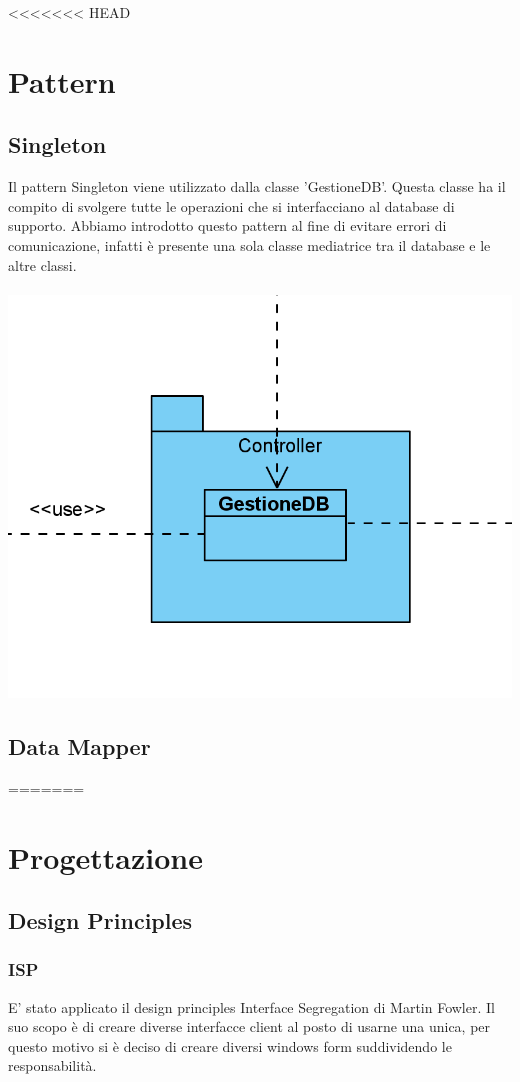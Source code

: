 \documentclass[a4paper, titlepage]{article}
\begin{document}
<<<<<<< HEAD
\section{Pattern}
\vphantom{}
\subsection{Singleton}
Il pattern Singleton viene utilizzato dalla classe 'GestioneDB'. Questa classe ha il compito di svolgere tutte le operazioni che si interfacciano al database di supporto. Abbiamo introdotto questo pattern al fine di evitare errori di comunicazione, infatti è presente una sola classe mediatrice tra il database e le altre classi.\\\\
\includegraphics[scale=0.80]{Immagini/Singleton.png}
\subsection{Data Mapper}
=======
\section{Progettazione}
\subsection{Design Principles}
\subsubsection{ISP}
E' stato applicato il design principles Interface Segregation di Martin Fowler. Il suo scopo è di creare diverse interfacce client al posto di usarne una unica, per questo motivo si è deciso di creare diversi windows form suddividendo le responsabilità.
\end{document}
